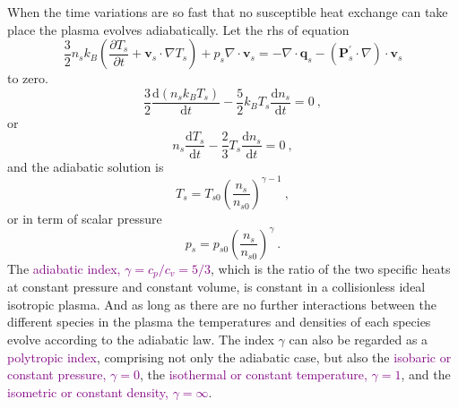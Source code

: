 \documentclass[12pt,a4paper]{article}
\renewcommand{\vec}[1]{\boldsymbol{#1}}
\newcommand{\dif}{\mathrm{d}}
\begin{document}
When the time variations are so fast that no susceptible heat exchange can take place the plasma evolves adiabatically. Let the rhs of equation
\begin{equation}
\frac{3}{2} n_s k_B \left(\frac{\partial T_s}{\partial t} +\vec{v}_s\cdot \nabla T_s \right) +p_s \nabla \cdot \vec{v}_s = -\nabla \cdot \vec{q}_s -(\mathbf{P}_s^\prime \cdot \nabla )\cdot \vec{v}_s
\end{equation}
to zero.
\begin{equation}
\frac{3}{2} \frac{\dif (n_s k_B T_s)}{\dif t} -\frac{5}{2} k_B T_s \frac{\dif n_s}{\dif t} = 0 ~,
\end{equation}
or
\begin{equation}
n_s \frac{\dif T_s}{\dif t} -\frac{2}{3} T_s \frac{\dif n_s}{\dif t} = 0 ~,
\end{equation}
and the adiabatic solution is
\begin{equation}
T_s = T_{s0} \left(\frac{n_s}{n_{s0}} \right)^{\gamma -1} ~,
\end{equation}
or in term of scalar pressure
\begin{equation}
p_s = p_{s0} \left(\frac{n_s}{n_{s0}} \right)^{\gamma} ~.
\end{equation}
The \textcolor{purple}{adiabatic index, $\gamma = c_p/c_v = 5/3$}, which is the ratio of the two specific heats at constant pressure and constant volume, is constant in a collisionless ideal isotropic plasma. And as long as there are no further interactions between the different species in the plasma the temperatures and densities of each species evolve according to the adiabatic law. The index $\gamma$ can also be regarded as a \textcolor{purple}{polytropic index}, comprising not only the adiabatic case, but also the \textcolor{purple}{isobaric or constant pressure, $\gamma =0$}, the  \textcolor{purple}{isothermal or constant temperature, $\gamma = 1$}, and the  \textcolor{purple}{isometric or constant density, $\gamma = \infty$}.
\end{document}
